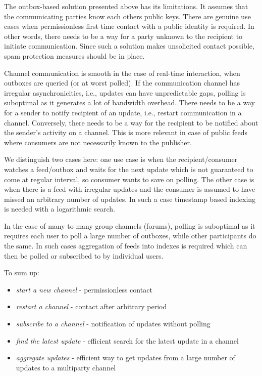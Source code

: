 
The outbox-based solution presented above has its limitations. It assumes that the communicating parties know each others public keys. There are genuine use cases when permissionless first time contact with a public identity is required. In other words, there needs to be a way for a party unknown to the recipient to initiate communication. Since such a solution makes unsolicited contact possible, spam protection measures should be in place.

Channel communication is smooth in the case of real-time interaction, when outboxes are queried (or at worst polled). If the communication channel has irregular asynchronicities, i.e., updates can have unpredictable gaps, polling is suboptimal as it generates a lot of bandwidth overhead. There needs to be a way for a sender to notify recipient of an update, i.e., restart communication in a channel. Conversely, there needs to be a way for the recipient to be notified about the sender's activity on a channel. This is more relevant in case of public feeds where consumers are not necessarily known to the publisher. 

We distinguish two cases here: one use case is when the recipient/consumer watches a feed/outbox and waits for the next update which is not guaranteed to come at regular interval, so consumer wants to save on polling. The other case is when there is a feed with irregular updates and the consumer is assumed to have missed an arbitrary number of updates.
In such a case timestamp based indexing is needed with a logarithmic search.

In the case of many to many group channels (forums), polling is suboptimal as it requires each user to poll a large number of outboxes, while other participants do the same. In such cases aggregation of feeds into indexes is required which can then be polled or subscribed to by individual users.

To sum up:

\begin{itemize}
    \item \emph{start a new channel} - permissionless contact           
    \item \emph{restart a channel} - contact after arbitrary period
    \item \emph{subscribe to a channel} - notification of updates without polling
    \item \emph{find the latest update} - efficient search for the latest update in a channel
    \item \emph{aggregate updates} - efficient way to get updates from a large number of updates to a multiparty channel
\end{itemize} 

